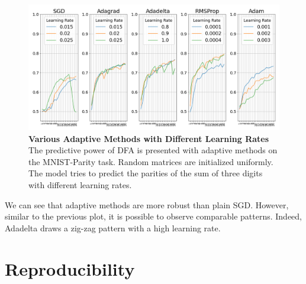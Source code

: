 \documentclass[a4paper, nobind]{templates/ociamthesis}
\begin{document}
\begin{figure}

{\centering \includegraphics[width=1\linewidth]{figures/B_k3_All_DFA_optimsWDifferentlrs} 

}

\caption[Various Adaptive Methods with Different Learning Rates]{\textbf{Various Adaptive Methods with Different Learning Rates} \newline The predictive power of DFA is presented with adaptive methods on the MNIST-Parity task. Random matrices are initialized uniformly. The model tries to predict the parities of the sum of three digits with different learning rates.}\label{fig:AdaptiveWDifferentLR}
\end{figure}

\noindent We can see that adaptive methods are more robust than plain SGD. However, similar to the previous plot, it is possible to observe comparable patterns. Indeed, Adadelta draws a zig-zag pattern with a high learning rate.

\hypertarget{reproducibility}{%
\chapter{Reproducibility}\label{reproducibility}}
\end{document}
